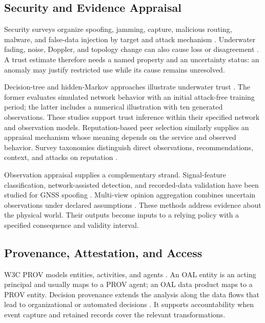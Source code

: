 \documentclass[blockchains,review,accept,moreauthors]{Definitions/mdpi}
\begin{document}
\subsection{Security and Evidence Appraisal}

Security surveys organize spoofing, jamming, capture, malicious routing, malware, and false-data injection by target and attack mechanism \citep{yahuza2021internet,mekdad2023survey,jiang2019securing,adam2024state}. Underwater fading, noise, Doppler, and topology change can also cause loss or disagreement \citep{ali2020recent,jouhari2019underwater,mohsan2022towards}. A trust estimate therefore needs a named property and an uncertainty status: an anomaly may justify restricted use while its cause remains unresolved.

Decision-tree and hidden-Markov approaches illustrate underwater trust . The former evaluates simulated network behavior with an initial attack-free training period; the latter includes a numerical illustration with ten generated observations. These studies support trust inference within their specified network and observation models. Reputation-based peer selection \citep{kamvar2003eigentrust} similarly supplies an appraisal mechanism whose meaning depends on the service and observed behavior. Survey taxonomies distinguish direct observations, recommendations, context, and attacks on reputation \citep{ahmed2019trust,aaqib2023iot,junior2021survey,liu2023survey}.

Observation appraisal supplies a complementary strand. Signal-feature classification, network-assisted detection, and recorded-data validation have been studied for GNSS spoofing \citep{shafique2021detecting,dang2022deep,semanjski2020use}. Multi-view opinion aggregation combines uncertain observations under declared assumptions \citep{liu2022trusted}. These methods address evidence about the physical world. Their outputs become inputs to a relying policy with a specified consequence and validity interval.

\subsection{Provenance, Attestation, and Access}

W3C PROV models entities, activities, and agents \citep{w3c2013provdm,w3c2013provo}. An OAL entity is an acting principal and usually maps to a PROV agent; an OAL data product maps to a PROV entity. Decision provenance extends the analysis along the data flows that lead to organizational or automated decisions \citep{singh2019decision}. It supports accountability when event capture and retained records cover the relevant transformations.
\end{document}
